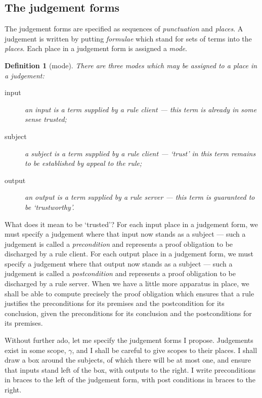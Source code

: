 \documentclass{jfp1}
\newtheorem{definition}[theorem]{Definition}
\begin{document}
\subsection{The judgement forms}

The judgement forms are specified as sequences of \emph{punctuation} and \emph{places}.
A judgement is written by putting \emph{formulae} which stand for sets of terms into the
\emph{places}. Each place in a judgement form is assigned a \emph{mode}.

\begin{definition}[mode]
  There are three modes which may be assigned to a place in a judgement:
  \begin{description}
  \item[input] an input is a term supplied by a rule client ---
    this term is already in some sense trusted;
  \item[subject] a subject is a term supplied by a rule client ---
    `trust' in this term remains to be established by appeal to the rule;
  \item[output] an output is a term supplied by a rule server ---
    this term is guaranteed to be `trustworthy'.
  \end{description}
\end{definition}

What does it mean to be `trusted'? For each input place in a judgement
form, we must specify a judgement where that input now stands as a
subject --- such a judgement is called a \emph{precondition} and
represents a proof obligation to be discharged by a rule client. For
each output place in a judgement form, we must specify a judgement
where that output now stands as a subject --- such a judgement is
called a \emph{postcondition} and represents a proof obligation to be
discharged by a rule server. When we have a little more apparatus in
place, we shall be able to compute precisely the proof obligation which ensures
that a rule justifies the preconditions for its premises and the postcondition
for its conclusion, given the preconditions for its conclusion and the postconditions
for its premises.

Without further ado, let me specify the judgement forms I propose. Judgements
exist in some scope, $\gamma$, and I shall be careful to give scopes to their
places. I shall draw a box around the subjects, of which there will be at
most one, and ensure that inputs stand left of the box, with outputs to the right.
I write preconditions in braces to the left of the judgement form, with post
conditions in braces to the right.
\end{document}
